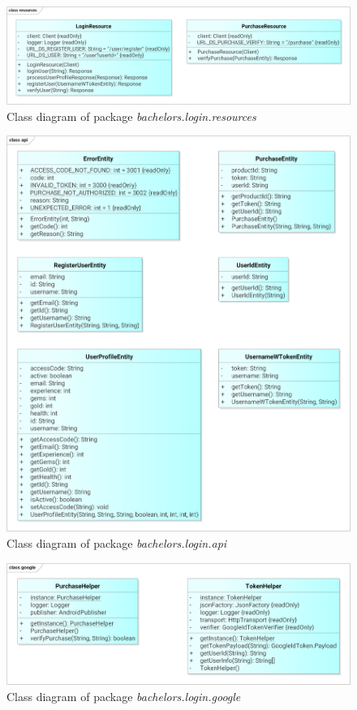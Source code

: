\begin{figure}[h]	
	\includegraphics[width=\textwidth]{figures/classdiagrams/lsresources}
	\centering			
	\caption{Class diagram of package \textit{bachelors.login.resources}}
\end{figure}

\begin{figure}[h]	
	\includegraphics[width=\textwidth]{figures/classdiagrams/lsapi}
	\centering			
	\caption{Class diagram of package \textit{bachelors.login.api}}
\end{figure}

\begin{figure}[h]	
	\includegraphics[width=\textwidth]{figures/classdiagrams/lsgoogle}
	\centering			
	\caption{Class diagram of package \textit{bachelors.login.google}}
\end{figure}

